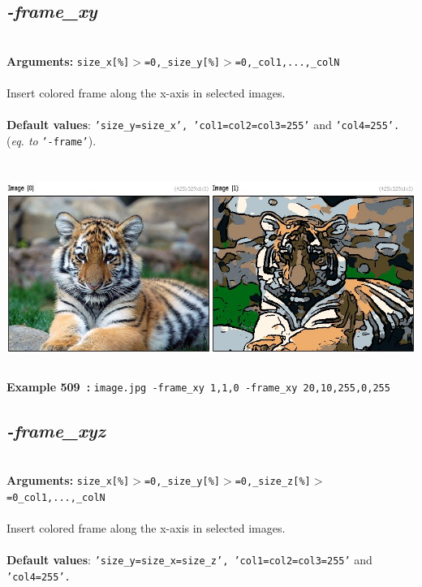 \documentclass[a4paper,11pt,twoside]{book}
\begin{document}
\subsection{\emph{-frame\_xy} }\vspace*{-0.5em}
~\\\textbf{Arguments: } 
{\small \texttt{size\_x[\%]$>$=0,\_size\_y[\%]$>$=0,\_col1,...,\_colN}}\\~\\
Insert colored frame along the x-axis in selected images.
~\\~\\\textbf{Default values}: {\small \texttt{'size\_y=size\_x', 'col1=col2=col3=255'} and \texttt{'col4=255'.}}
~\\(\emph{eq. to} {\small \texttt{'-frame'}}).
\begin{center}\includegraphics[keepaspectratio=true,height=7cm,width=\textwidth]{img/gmic_def509.jpg}\\
{\footnotesize \textbf{Example 509~:} \texttt{image.jpg -frame\_xy 1,1,0 -frame\_xy 20,10,255,0,255}}
\end{center}

\subsection{\emph{-frame\_xyz} }\vspace*{-0.5em}
~\\\textbf{Arguments: } 
{\small \texttt{size\_x[\%]$>$=0,\_size\_y[\%]$>$=0,\_size\_z[\%]$>$=0\_col1,...,\_colN}}\\~\\
Insert colored frame along the x-axis in selected images.
~\\~\\\textbf{Default values}: {\small \texttt{'size\_y=size\_x=size\_z', 'col1=col2=col3=255'} and \texttt{'col4=255'.}}
\end{document}
